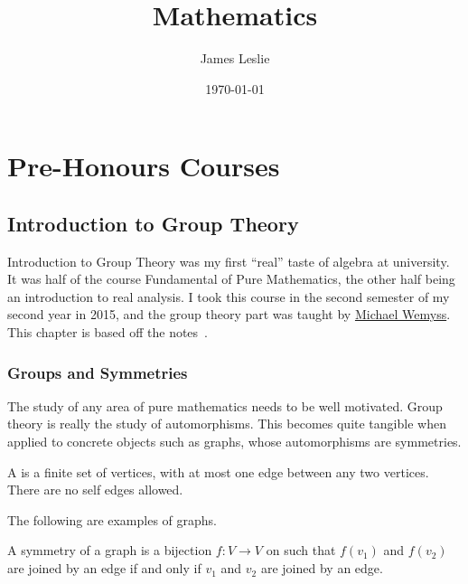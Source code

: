 \documentclass[12pt]{report}
\title{Mathematics}
\author{James Leslie}
\date{\today}
\begin{document}
\maketitle
\tableofcontents

\part{Pre-Honours Courses}\label{part:pre-honours-courses}
\chapter{Introduction to Group Theory}\label{cha:intr-group-theory}
Introduction to Group Theory was my first ``real'' taste of algebra at university. It was half of the course Fundamental of Pure Mathematics, the other half being an introduction to real analysis. I took this course in the second semester of my second year in 2015, and the group theory part was taught by \href{https://www.maths.gla.ac.uk/~mwemyss/}{Michael Wemyss}. This chapter is based off the notes~\cite{wemyss2015grouptheory}.

\section{Groups and Symmetries}
The study of any area of pure mathematics needs to be well motivated. Group theory is really the study of automorphisms. This becomes quite tangible when applied to concrete objects such as graphs, whose automorphisms are symmetries.

\begin{definition}\cite[Definition 1.1.1]{wemyss2015grouptheory}\label{def:intr-group-theory:graph}
  A  is a finite set of vertices, with at most one edge between any two vertices. There are no self edges allowed.
\end{definition}

\begin{example}
  The following are examples of graphs.

\end{example}

\begin{definition}\cite[Definition 1.1.3]{wemyss2015grouptheory}
  A symmetry of a graph is a bijection \(f : V \to V\) on such that \(f(v_{1})\) and \(f(v_{2})\) are joined by an edge if and only if \(v_{1}\) and \(v_{2}\) are joined by an edge.
\end{definition}
\end{document}
